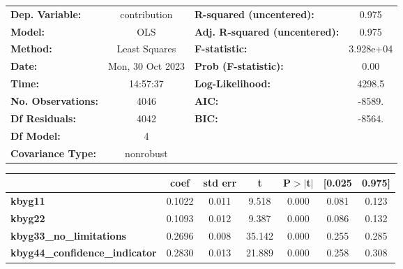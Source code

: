 \begin{center}
\begin{tabular}{lclc}
\toprule
\textbf{Dep. Variable:}                &   contribution   & \textbf{  R-squared (uncentered):}      &     0.975   \\
\textbf{Model:}                        &       OLS        & \textbf{  Adj. R-squared (uncentered):} &     0.975   \\
\textbf{Method:}                       &  Least Squares   & \textbf{  F-statistic:       }          & 3.928e+04   \\
\textbf{Date:}                         & Mon, 30 Oct 2023 & \textbf{  Prob (F-statistic):}          &     0.00    \\
\textbf{Time:}                         &     14:57:37     & \textbf{  Log-Likelihood:    }          &    4298.5   \\
\textbf{No. Observations:}             &        4046      & \textbf{  AIC:               }          &    -8589.   \\
\textbf{Df Residuals:}                 &        4042      & \textbf{  BIC:               }          &    -8564.   \\
\textbf{Df Model:}                     &           4      & \textbf{                     }          &             \\
\textbf{Covariance Type:}              &    nonrobust     & \textbf{                     }          &             \\
\bottomrule
\end{tabular}
\begin{tabular}{lcccccc}
                                       & \textbf{coef} & \textbf{std err} & \textbf{t} & \textbf{P$> |$t$|$} & \textbf{[0.025} & \textbf{0.975]}  \\
\midrule
\textbf{kbyg11}                        &       0.1022  &        0.011     &     9.518  &         0.000        &        0.081    &        0.123     \\
\textbf{kbyg22}                        &       0.1093  &        0.012     &     9.387  &         0.000        &        0.086    &        0.132     \\
\textbf{kbyg33\_no\_limitations}       &       0.2696  &        0.008     &    35.142  &         0.000        &        0.255    &        0.285     \\
\textbf{kbyg44\_confidence\_indicator} &       0.2830  &        0.013     &    21.889  &         0.000        &        0.258    &        0.308     \\

\end{tabular}
\end{center}
